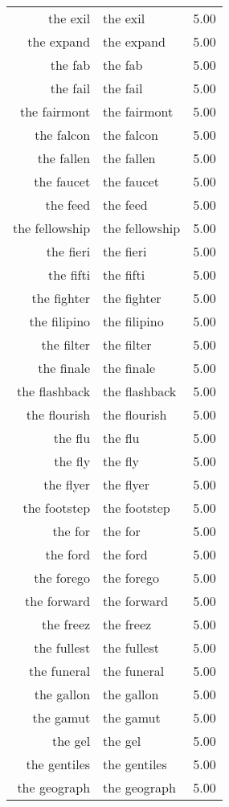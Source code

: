 \begin{table}[ht]
\begin{tabular}{rlr}
  the exil & the exil & 5.00 \\ 
  the expand & the expand & 5.00 \\ 
  the fab & the fab & 5.00 \\ 
  the fail & the fail & 5.00 \\ 
  the fairmont & the fairmont & 5.00 \\ 
  the falcon & the falcon & 5.00 \\ 
  the fallen & the fallen & 5.00 \\ 
  the faucet & the faucet & 5.00 \\ 
  the feed & the feed & 5.00 \\ 
  the fellowship & the fellowship & 5.00 \\ 
  the fieri & the fieri & 5.00 \\ 
  the fifti & the fifti & 5.00 \\ 
  the fighter & the fighter & 5.00 \\ 
  the filipino & the filipino & 5.00 \\ 
  the filter & the filter & 5.00 \\ 
  the finale & the finale & 5.00 \\ 
  the flashback & the flashback & 5.00 \\ 
  the flourish & the flourish & 5.00 \\ 
  the flu & the flu & 5.00 \\ 
  the fly & the fly & 5.00 \\ 
  the flyer & the flyer & 5.00 \\ 
  the footstep & the footstep & 5.00 \\ 
  the for & the for & 5.00 \\ 
  the ford & the ford & 5.00 \\ 
  the forego & the forego & 5.00 \\ 
  the forward & the forward & 5.00 \\ 
  the freez & the freez & 5.00 \\ 
  the fullest & the fullest & 5.00 \\ 
  the funeral & the funeral & 5.00 \\ 
  the gallon & the gallon & 5.00 \\ 
  the gamut & the gamut & 5.00 \\ 
  the gel & the gel & 5.00 \\ 
  the gentiles & the gentiles & 5.00 \\ 
  the geograph & the geograph & 5.00 \\ 

\end{tabular}
\end{table}
